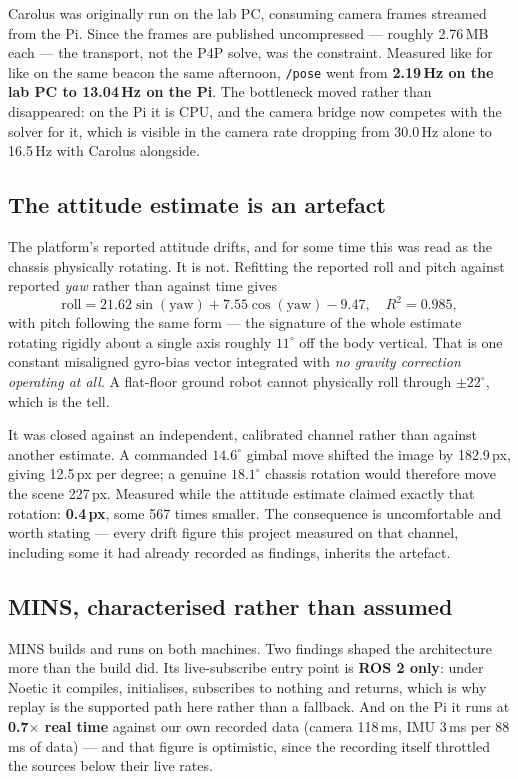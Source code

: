 \documentclass[11pt]{article}
\begin{document}
Carolus was originally run on the lab PC, consuming camera frames streamed
from the Pi. Since the frames are published uncompressed --- roughly
2.76\,MB each --- the transport, not the P4P solve, was the constraint.
Measured like for like on the same beacon the same afternoon, \texttt{/pose}
went from \textbf{2.19\,Hz on the lab PC to 13.04\,Hz on the Pi}. The
bottleneck moved rather than disappeared: on the Pi it is CPU, and the
camera bridge now competes with the solver for it, which is visible in the
camera rate dropping from 30.0\,Hz alone to 16.5\,Hz with Carolus alongside.

\subsection{The attitude estimate is an artefact}

The platform's reported attitude drifts, and for some time this was read as
the chassis physically rotating. It is not. Refitting the reported roll and
pitch against reported \emph{yaw} rather than against time gives
\[
\text{roll} = 21.62\sin(\text{yaw}) + 7.55\cos(\text{yaw}) - 9.47,
\quad R^2 = 0.985,
\]
with pitch following the same form --- the signature of the whole estimate
rotating rigidly about a single axis roughly $11^\circ$ off the body
vertical. That is one constant misaligned gyro-bias vector integrated with
\emph{no gravity correction operating at all}. A flat-floor ground robot
cannot physically roll through $\pm22^\circ$, which is the tell.

It was closed against an independent, calibrated channel rather than against
another estimate. A commanded $14.6^\circ$ gimbal move shifted the image by
182.9\,px, giving 12.5\,px per degree; a genuine $18.1^\circ$ chassis
rotation would therefore move the scene 227\,px. Measured while the attitude
estimate claimed exactly that rotation: \textbf{0.4\,px}, some 567 times
smaller. The consequence is uncomfortable and worth stating --- every drift
figure this project measured on that channel, including some it had already
recorded as findings, inherits the artefact.

\subsection{MINS, characterised rather than assumed}

MINS builds and runs on both machines. Two findings shaped the architecture
more than the build did. Its live-subscribe entry point is \textbf{ROS 2
only}: under Noetic it compiles, initialises, subscribes to nothing and
returns, which is why replay is the supported path here rather than a
fallback. And on the Pi it runs at \textbf{0.7$\times$ real time} against
our own recorded data (camera 118\,ms, IMU 3\,ms per 88\,ms of data) --- and
that figure is optimistic, since the recording itself throttled the sources
below their live rates.
\end{document}
